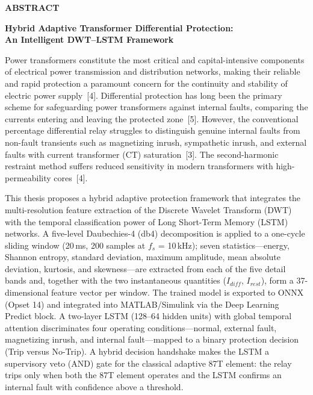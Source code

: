 \documentclass[12pt,a4paper,oneside]{report}
\newcommand{\frontchaptoc}[1]{%
  \clearpage\thispagestyle{fancy}%
  \phantomsection\addcontentsline{toc}{chapter}{#1}%
  \begin{center}\Large\bfseries #1\end{center}\vspace{6pt}}
\begin{document}
\frontchaptoc{ABSTRACT}
\begin{center}{\bfseries Hybrid Adaptive Transformer Differential Protection:\\ An Intelligent DWT--LSTM Framework\par}\end{center}
\vspace{6pt}
Power transformers constitute the most critical and capital-intensive components of electrical power transmission and distribution networks, making their reliable and rapid protection a paramount concern for the continuity and stability of electric power supply~[4]. Differential protection has long been the primary scheme for safeguarding power transformers against internal faults, comparing the currents entering and leaving the protected zone~[5]. However, the conventional percentage differential relay struggles to distinguish genuine internal faults from non-fault transients such as magnetizing inrush, sympathetic inrush, and external faults with current transformer (CT) saturation~[3]. The second-harmonic restraint method suffers reduced sensitivity in modern transformers with high-permeability cores~[4].

This thesis proposes a hybrid adaptive protection framework that integrates the multi-resolution feature extraction of the Discrete Wavelet Transform (DWT) with the temporal classification power of Long Short-Term Memory (LSTM) networks. A five-level Daubechies-4 (db4) decomposition is applied to a one-cycle sliding window (20\,ms, 200 samples at $f_s$ = 10\,kHz); seven statistics---energy, Shannon entropy, standard deviation, maximum amplitude, mean absolute deviation, kurtosis, and skewness---are extracted from each of the five detail bands and, together with the two instantaneous quantities ($I_{diff}$, $I_{rest}$), form a 37-dimensional feature vector per window. The trained model is exported to ONNX (Opset 14) and integrated into MATLAB/Simulink via the Deep Learning Predict block. A two-layer LSTM (128--64 hidden units) with global temporal attention discriminates four operating conditions---normal, external fault, magnetizing inrush, and internal fault---mapped to a binary protection decision (Trip versus No-Trip). A hybrid decision handshake makes the LSTM a supervisory veto (AND) gate for the classical adaptive 87T element: the relay trips only when both the 87T element operates and the LSTM confirms an internal fault with confidence above a threshold.
\end{document}
